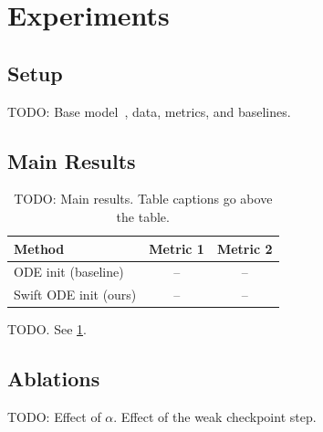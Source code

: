 \section{Experiments}
\label{sec:experiments}

\subsection{Setup}
TODO: Base model~\citep{wan2025}, data, metrics, and baselines.

\subsection{Main Results}

\begin{table}[t]
  \caption{TODO: Main results. Table captions go above the table.}
  \label{tab:main}
  \centering
  \small
  \begin{tabular}{lcc}
    \toprule
    Method & Metric 1 & Metric 2 \\
    \midrule
    ODE init (baseline) & -- & -- \\
    Swift ODE init (ours) & -- & -- \\
    \bottomrule
  \end{tabular}
\end{table}

TODO. See \cref{tab:main}.

\subsection{Ablations}
TODO: Effect of $\alpha$. Effect of the weak checkpoint step.
